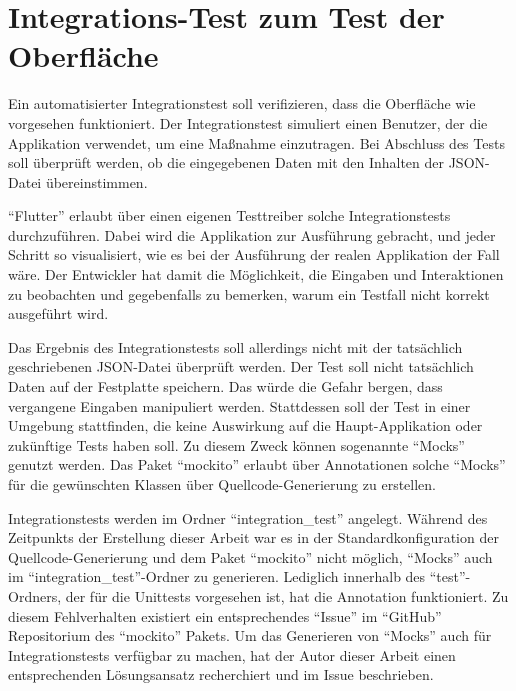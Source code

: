 


\section{Integrations-Test zum Test der Oberfläche}


Ein automatisierter Integrationstest soll verifizieren, dass die Oberfläche wie vorgesehen funktioniert.
Der Integrationstest simuliert einen Benutzer, der die Applikation verwendet, um eine Maßnahme einzutragen.
Bei Abschluss des Tests soll überprüft werden, ob die  eingegebenen Daten mit den Inhalten der JSON-Datei übereinstimmen.

\enquote{Flutter} erlaubt über einen eigenen Testtreiber solche Integrationstests durchzuführen.
Dabei wird die Applikation zur Ausführung gebracht, und jeder Schritt so visualisiert, wie es bei der Ausführung der realen Applikation der Fall wäre.
Der Entwickler hat damit die Möglichkeit, die Eingaben und Interaktionen zu beobachten und gegebenfalls zu bemerken, warum ein Testfall nicht korrekt ausgeführt wird.

Das Ergebnis des Integrationstests soll allerdings nicht mit der tatsächlich geschriebenen JSON-Datei überprüft werden.
Der Test soll nicht tatsächlich Daten auf der Festplatte speichern.
Das würde die Gefahr bergen, dass vergangene Eingaben manipuliert werden.
Stattdessen soll der Test in einer Umgebung stattfinden, die keine Auswirkung auf die Haupt-Applikation oder zukünftige Tests haben soll.
Zu diesem Zweck können sogenannte \enquote{Mocks} genutzt werden.
Das Paket \enquote{mockito} erlaubt über Annotationen solche \enquote{Mocks} für die gewünschten Klassen  über Quellcode-Generierung zu erstellen.

Integrationstests werden im Ordner \enquote{integration_test} angelegt.
Während des Zeitpunkts der Erstellung dieser Arbeit war es in der Standardkonfiguration der Quellcode-Generierung und dem Paket \enquote{mockito} nicht möglich, \enquote{Mocks} auch im \enquote{integration_test}-Ordner zu generieren.  Lediglich innerhalb des \enquote{test}-Ordners, der für die Unittests vorgesehen ist, hat die Annotation  funktioniert. Zu diesem Fehlverhalten existiert ein entsprechendes \enquote{Issue} im \enquote{GitHub} Repositorium  des \enquote{mockito} Pakets.  Um das Generieren von \enquote{Mocks} auch für Integrationstests verfügbar zu machen, hat der Autor dieser Arbeit einen entsprechenden Lösungsansatz recherchiert und im Issue beschrieben. 

